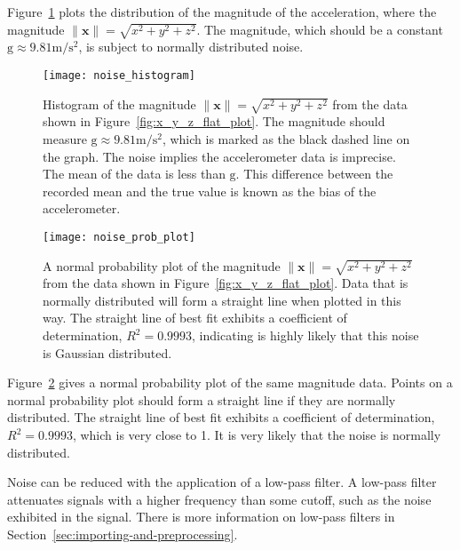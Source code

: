       
      Figure~\ref{fig:noise_histogram} plots the distribution of the magnitude of the acceleration, where the magnitude $\|\mathbf{x}\| = \sqrt{x^2+y^2+z^2}$. The magnitude, which should be a constant $\mathrm{g} \approx 9.81 \si{\meter\per\square\second}$, is subject to normally distributed noise.
      
      \begin{figure}[p]
        \centering
        \texttt{[image: noise\_histogram]}
        \caption[Histogram of the magnitude from the data shown in Figure~\ref{fig:x_y_z_flat_plot}.]{Histogram of the magnitude $\|\mathbf{x}\| = \sqrt{x^2+y^2+z^2}$ from the data shown in Figure~\ref{fig:x_y_z_flat_plot}. The magnitude should measure $ \mathrm{g} \approx 9.81\si{\metre\per\square\second}$, which is marked as the black dashed line on the graph. The noise implies the accelerometer data is imprecise. The mean of the data is less than $\mathrm{g}$. This difference between the recorded mean and the true value is known as the bias of the accelerometer.}
        \label{fig:noise_histogram}
      \end{figure}
      
      \begin{figure}[p]
        \centering
        \texttt{[image: noise\_prob\_plot]}
        \caption[A normal probability plot of the magnitude from the data shown in Figure~\ref{fig:x_y_z_flat_plot}.]{A normal probability plot of the magnitude $\|\mathbf{x}\| = \sqrt{x^2+y^2+z^2}$  from the data shown in Figure~\ref{fig:x_y_z_flat_plot}. Data that is normally distributed will form a straight line when plotted in this way. The straight line of best fit exhibits a coefficient of determination, $R^2 = 0.9993$, indicating is highly likely that this noise is Gaussian distributed.}
        \label{fig:noise_prob_plot}
      \end{figure}
      
      Figure~\ref{fig:noise_prob_plot} gives a normal probability plot of the same magnitude data. Points on a normal probability plot should form a straight line if they are normally distributed. The straight line of best fit exhibits a coefficient of determination, $R^2 = 0.9993$, which is very close to 1. It is very likely that the noise is normally distributed.
      
      
      Noise can be reduced with the application of a low-pass filter. A low-pass filter attenuates signals with a higher frequency than some cutoff, such as the noise exhibited in the signal. There is more information on low-pass filters in Section~\ref{sec:importing-and-preprocessing}.
      
